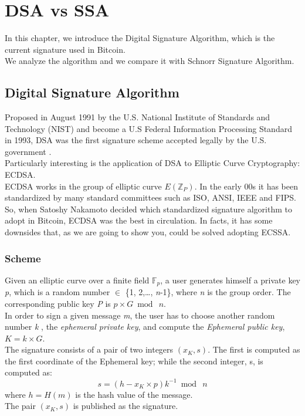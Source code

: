 \chapter{DSA vs SSA}
\label{capitolo5}

In this chapter, we introduce the Digital Signature Algorithm, which is the current signature used in Bitcoin. \\
We analyze the algorithm and we compare it with Schnorr Signature Algorithm.



\section{Digital Signature Algorithm}
Proposed in August 1991 by the U.S. National Institute of Standards and Technology (NIST) and become a U.S Federal Information Processing Standard in 1993, DSA was the first signature scheme  accepted legally by the U.S. government \cite{ECDSA}.\\
Particularly interesting is the application of DSA to Elliptic Curve Cryptography: ECDSA.\\
ECDSA works in the group of elliptic curve $E(\mathbb{Z}_{P})$. In the early 00s it has been standardized by many standard committees such as ISO, ANSI, IEEE and FIPS. So, when Satoshy Nakamoto decided which standardized signature algorithm to adopt in Bitcoin, ECDSA was the best in circulation. In facts, it has some downsides that, as we are going to show you, could be solved adopting ECSSA.
\subsection{Scheme}
Given an elliptic curve over a finite field $\mathbb{F} _{p}$, a user generates himself a private key \textit{p}, which is a random number $\in$ \{1, 2,\dots, \textit{n}-1\}, where \textit{n} is the group order. The corresponding public key \textit{P} is $\textit{p}\times G\bmod\ n$. \\
In order to sign a given message \textit{m}, the user has to choose another random number \textit{k}%
, the \textit{ephemeral private key}, and compute the \textit{Ephemeral public key}, $\textit{K}= k \times G$.
\\
The signature consists of a pair of two integers $(x_{K}, s)$. The first is computed as the first coordinate of the Ephemeral
key; while the second integer, s, is computed as: 
\begin{equation}
\label{eqn:s2}
s=(h - x_{K} \times p) k^{-1}\bmod\ n
\end{equation}
where $h=H(m)$ is the hash value of the message. \\
The pair $(x_{K},s)$ is published as the signature.\\

